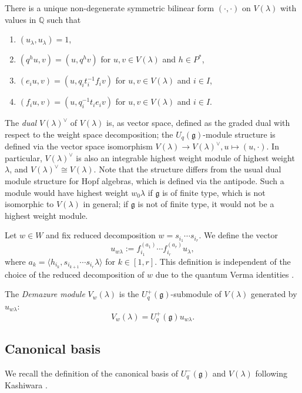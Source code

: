 \documentclass[final]{amsart}
\theoremstyle{plain}
\theoremstyle{definition}
\newcommand{\bbQ}{\mathbb Q}
\newcommand{\frakg}{\mathfrak g}
\begin{document}
There is a unique non-degenerate symmetric bilinear form $(\cdot, \cdot)$ on $V(\lambda)$ with values in $\bbQ$ \cite{Kashiwara:CrystalBases-QuantizedUniversalEnvelopingAlgebras} such that
\begin{enumerate}
    \item $(u_\lambda, u_\lambda) = 1$,
    \item $(q^h u, v) = (u, q^h v)$ for $u, v \in V(\lambda)$ and $h\in P^*$,
    \item $(e_i u, v) = (u, q_i t_i^{-1} f_i v)$ for $u, v \in V(\lambda)$ and $i\in I$,
    \item $(f_i u, v) = (u, q_i^{-1} t_i e_i v)$ for $u, v \in V(\lambda)$ and $i\in I$.
\end{enumerate}

The \emph{dual} $V(\lambda)^\vee$ of $V(\lambda)$ is, as vector space, defined as the graded dual with respect to the weight space decomposition; the $U_q(\frakg)$-module structure is defined via the vector space isomorphism $V(\lambda) \to V(\lambda)^\vee, u \mapsto (u, \cdot)$.
In particular, $V(\lambda)^\vee$ is also an integrable highest weight module of highest weight $\lambda$, and $V(\lambda)^\vee \cong V(\lambda)$.
Note that the structure differs from the usual dual module structure for Hopf algebras, which is defined via the antipode.
Such a module would have highest weight $w_0\lambda$ if $\frakg$ is of finite type, which is not isomorphic to $V(\lambda)$ in general; if $\frakg$ is not of finite type, it would not be a highest weight module.

Let $w \in W$ and fix reduced decomposition $w = s_{i_1}\cdots s_{i_r}$.
We define the vector
\[
    u_{w\lambda} := f_{i_1}^{(a_1)} \cdots f_{i_r}^{(a_r)} u_\lambda,
\]
where $a_k = \langle h_{i_k}, s_{i_{k+1}}\cdots s_{i_r} \lambda\rangle$ for $k \in [1, r]$.
This definition is independent of the choice of the reduced decomposition of $w$ due to the quantum Verma identities \cite[Proposition 39.3.7]{Lusztig:IntroductionToQuantumGroups}.

The \emph{Demazure module} $V_w(\lambda)$ is the $U_q^+(\frakg)$-submodule of $V(\lambda)$ generated by $u_{w\lambda}$:
\[
    V_w(\lambda) = U_q^+(\frakg) u_{w\lambda}.
\]

\subsection{Canonical basis}

We recall the definition of the canonical basis of $U_q^-(\frakg)$ and $V(\lambda)$ following Kashiwara \cite{Kashiwara:CrystalBases-QuantizedUniversalEnvelopingAlgebras}.
\end{document}
